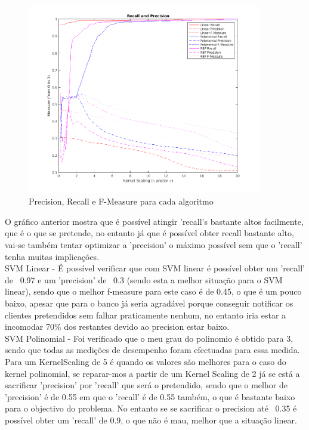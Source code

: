 \documentclass[portugues,final]{revdetua}
\begin{document}
\begin{figure}[H]
\centerline{\includegraphics[width=290pt]{images/svm_recall_precision.png}}
\caption{Precision, Recall e F-Measure para cada algoritmo}
\label{img:complete}
\end{figure}


O gráfico anterior mostra que é possível atingir 'recall's bastante altos facilmente, que é o que se pretende, no entanto já que é possível obter recall bastante alto, vai-se também tentar optimizar a 'precision' o máximo possível sem que o 'recall' tenha muitas implicações.\\

SVM Linear - É possível verificar que com SVM linear é possível obter um 'recall' de ~0.97 e um 'precision' de ~0.3 (sendo esta a melhor situação para o SVM linear), sendo que o melhor f-measure para este caso é de 0.45, o que é um pouco baixo, apesar que para o banco já seria agradável porque conseguir notificar os clientes pretendidos sem falhar praticamente nenhum, no entanto iria estar a incomodar 70\% dos restantes devido ao precision estar baixo. \\

SVM Polinomial - Foi verificado que o meu grau do polinomio é obtido para 3, sendo que todas as medições de desempenho foram efectuadas para essa medida. Para um KernelScaling de 5 é quando os valores são melhores para o caso do kernel polinomial, se reparar-mos a partir de um Kernel Scaling de 2 já se está a sacrificar 'precision' por 'recall' que será o pretendido, sendo que o melhor de 'precision' é de 0.55 em que o 'recall' é de 0.55 também, o que é bastante baixo para o objectivo do problema. No entanto se se sacrificar o precision até ~0.35 é possível obter um 'recall' de 0.9, o que não é mau, melhor que a situação linear.\\
\end{document}
